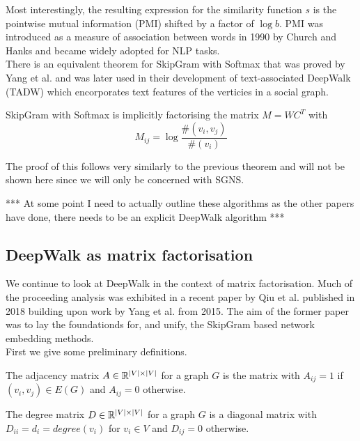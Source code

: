 \documentclass[a4paper]{article}
\begin{document}
Most interestingly, the resulting expression for the similarity function $s$ is
the pointwise mutual information (PMI) shifted by a factor of $\log b$. PMI was
introduced as a measure of association between words in 1990 by Church and Hanks
\cite{church1990} and became widely adopted for NLP tasks.\\

There is an equivalent theorem for SkipGram with Softmax that was proved by Yang
et al.\cite{yangalternative2015} and was later used in their development of
text-associated DeepWalk (TADW)\cite{yang2015} which encorporates text features
of the verticies in a social graph.

\begin{theorem}[Yang et al. (2015)]
  SkipGram with Softmax is implicitly factorising the matrix $M = WC^T$ with
  \[M_{ij} = \log{\frac{\#(v_i,v_j)}{\#(v_i)}}\]
\end{theorem}

The proof of this follows very similarly to the previous theorem and will not be
shown here since we will only be concerned with SGNS.



*** At some point I need to actually outline these algorithms as the other
papers have done, there needs to be an explicit DeepWalk algorithm ***

\subsection{DeepWalk as matrix factorisation}

We continue to look at DeepWalk in the context of matrix factorisation. Much of the proceeding analysis was exhibited in a recent paper by Qiu et
al.\cite{qiu2018} published in 2018 building upon work by Yang et al.\cite{yang2015}
from 2015. The aim of the former paper was to lay the foundationds for, and
unify, the SkipGram based network embedding methods.\\

First we give some preliminary definitions.

\begin{definition}
  The adjacency matrix $A \in \R^{|V| \times |V|}$ for a graph $G$ is the matrix with $A_{ij} = 1$ if $(v_i, v_j) \in E(G)$ and $A_{ij} = 0$ otherwise.
\end{definition}

\begin{definition}
  The degree matrix $D \in \R^{|V| \times |V|}$ for a graph $G$ is a diagonal
  matrix with $D_{ii} = d_i = degree(v_i)$ for $v_i \in V$ and $D_{ij} = 0$ otherwise.
\end{definition}
\end{document}
